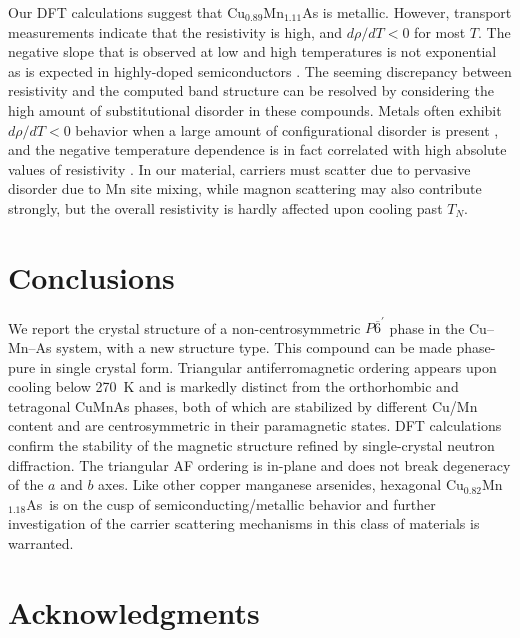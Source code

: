 \documentclass[letterpaper,10pt,doublespacing,edeposit]{uiucthesis2020}
\newcommand*{\cumnas}{Cu$_{0.82}$Mn$_{1.18}$As}
\begin{document}
\begin{mainmatter}
Our DFT calculations suggest that Cu$_{0.89}$Mn$_{1.11}$As is metallic. However, transport measurements indicate that the resistivity is high, and $d\rho/dT < 0$ for most $T$. 
The negative slope that is observed at low and high temperatures is not exponential as is expected in highly-doped semiconductors \cite{Chapman1963}.
The seeming discrepancy between resistivity and the computed band structure can be resolved by considering the high amount of substitutional disorder in these compounds.
Metals often exhibit $d\rho/dT < 0$ behavior when a large amount of configurational disorder is present \cite{Elk1979}, and the negative temperature dependence is in fact correlated with high absolute values of resistivity \cite{Mooij1973}.
In our material, carriers must scatter due to pervasive disorder due to Mn site mixing, while magnon scattering may also contribute strongly, but the overall resistivity is hardly affected upon cooling past $T_N$.

\section{Conclusions}

We report the crystal structure of a non-centrosymmetric $P\overline{6}^\prime$ phase in the Cu--Mn--As system, with a new structure type. This compound can be made phase-pure in single crystal form. Triangular antiferromagnetic ordering appears upon cooling below 270~K and is markedly distinct from the orthorhombic and tetragonal CuMnAs phases, both of which are stabilized by different Cu/Mn content and are centrosymmetric in their paramagnetic states. DFT calculations confirm the stability of the magnetic structure refined by single-crystal neutron diffraction. The triangular AF ordering is in-plane and does not break degeneracy of the $a$ and $b$ axes.  Like other copper manganese arsenides, hexagonal \cumnas\ is on the cusp of semiconducting/metallic behavior and further investigation of the carrier scattering mechanisms in this class of materials is warranted.


\section{Acknowledgments}


\end{mainmatter}
\end{document}
